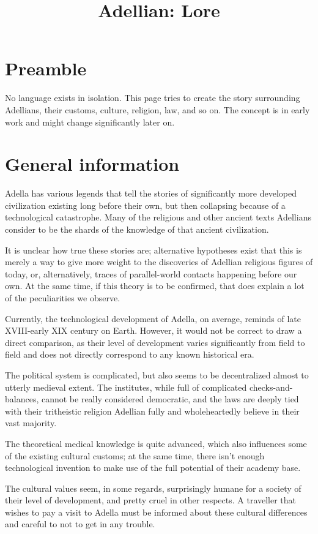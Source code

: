 \documentclass[12pt]{article}
\begin{document}
	\title{Adellian: Lore}
	\maketitle
	
	\section{Preamble}
	
	No language exists in isolation. This page tries to create the story surrounding Adellians, their customs, culture, religion, law, and so on. The concept is in early work and might change significantly later on.
	
	\tableofcontents
	
	\section{General information}
	
	Adella has various legends that tell the stories of significantly more developed civilization existing long before their own, but then collapsing because of a technological catastrophe. Many of the religious and other ancient texts Adellians consider to be the shards of the knowledge of that ancient civilization.
	
	It is unclear how true these stories are; alternative hypotheses exist that this is merely a way to give more weight to the discoveries of Adellian religious figures of today, or, alternatively, traces of parallel-world contacts happening before our own. At the same time, if this theory is to be confirmed, that does explain a lot of the peculiarities we observe.
	
	Currently, the technological development of Adella, on average, reminds of late XVIII-early XIX century on Earth. However, it would not be correct to draw a direct comparison, as their level of development varies significantly from field to field and does not directly correspond to any known historical era.
	
	The political system is complicated, but also seems to be decentralized almost to utterly medieval extent. The institutes, while full of complicated checks-and-balances, cannot be really considered democratic, and the laws are deeply tied with their tritheistic religion Adellian fully and wholeheartedly believe in their vast majority.
	
	The theoretical medical knowledge is quite advanced, which also influences some of the existing cultural customs; at the same time, there isn't enough technological invention to make use of the full potential of their academy base.
	
	The cultural values seem, in some regards, surprisingly humane for a society of their level of development, and pretty cruel in other respects. A traveller that wishes to pay a visit to Adella must be informed about these cultural differences and careful to not to get in any trouble.
	
\end{document}
